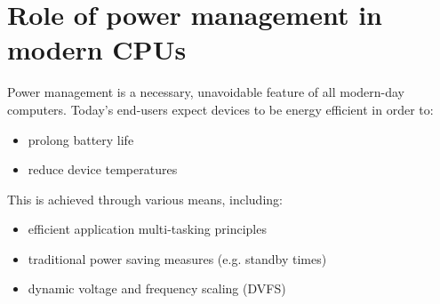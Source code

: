 \section{Role of power management in modern CPUs}

Power management is a necessary, unavoidable feature of all modern-day
computers.
Today’s end-users expect devices to be energy efficient in order to:
\begin{itemize}
    \item prolong battery life
    \item reduce device temperatures
\end{itemize}
This is achieved through various means, including:
\begin{itemize}
    \item efficient application multi-tasking principles
    \item traditional power saving measures (e.g. standby times)
    \item dynamic voltage and frequency scaling (DVFS)
\end{itemize}

